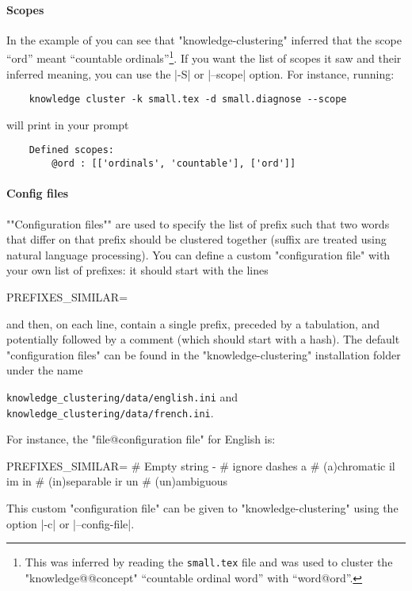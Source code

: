 \documentclass{article}
\begin{document}
\paragraph{Scopes} In the example of
you can see that "knowledge-cluste\-ring" inferred that the
scope ``ord'' meant ``countable ordinals''\footnote{This was inferred
by reading the \texttt{small.tex} file and was used to cluster
the "knowledge@@concept" ``countable ordinal word'' with ``word@ord''.}.
If you want the list of scopes it saw
and their inferred meaning, you can use the \spverb|-S| or \spverb|--scope| 
option. 
For instance, running:
\begin{verbatim}
    knowledge cluster -k small.tex -d small.diagnose --scope
\end{verbatim}
will print in your prompt
\begin{verbatim}
    Defined scopes:
	    @ord : [['ordinals', 'countable'], ['ord']]
\end{verbatim}

\paragraph{Config files} \AP""Configuration files"" are used to specify
the list of 
prefix such that two words that differ on that prefix should be clustered 
together (suffix are treated using natural language processing).
You can define a custom "configuration file" with your own list of prefixes:
it should start with the lines 
\begin{spverbatim}
    [DEFAULT]
    PREFIXES_SIMILAR=
\end{spverbatim}
and then, on each line, contain a single prefix, preceded by a tabulation,
and potentially followed by a comment (which should start with a hash).
The default "configuration files" can be found
in the "knowledge-clustering" installation folder under the name
\begin{center}%
    \texttt{knowledge\_clustering/data/english.ini}
    and \texttt{knowledge\_clustering/data/french.ini}.
\end{center}
For instance, the "file@configuration file" for English is:
\begin{spverbatim}
    [DEFAULT]
    PREFIXES_SIMILAR=
        # Empty string
        - # ignore dashes
        a # (a)chromatic
        il
        im
        in # (in)separable
        ir
        un # (un)ambiguous    
\end{spverbatim}
This custom "configuration file" can be given to "knowledge-clustering"
using the option \spverb|-c| or \spverb|--config-file|.
\end{document}
